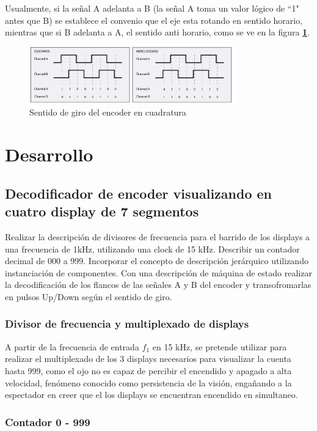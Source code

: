 \documentclass[11pt, a4paper]{article}
\begin{document}
Usualmente, si la señal A adelanta a B (la señal A toma un valor lógico de ``1" antes que B) se establece el convenio que el eje esta rotando en sentido horario, mientras que si B adelanta a A, el sentido anti horario, como se ve en la figura \textcolor{blue}{\textbf{\ref{fig:encoder_cuadratura}}}.
\begin{figure}[h]
	\centering
	\includegraphics[width=0.8\textwidth]{Imagenes/encoder_cuadratura.jpg}
	\caption{Sentido de giro del encoder en cuadratura}
	\label{fig:encoder_cuadratura}
\end{figure} 

\section{Desarrollo}

	\subsection{Decodificador de encoder visualizando en cuatro display de 7 segmentos}
	Realizar la descripción de divisores de frecuencia para el barrido de los displays a una frecuencia de 1kHz, utilizando una clock de 15 kHz. Describir un contador decimal de 000 a 999. Incorporar el concepto de descripción jerárquico utilizando instanciación de componentes.
	Con una descripción de máquina de estado realizar la decodificación de los flancos de las señales A y B del encoder y transofromarlas en pulsos Up/Down según el sentido de giro.

		\subsubsection{Divisor de frecuencia y multiplexado de displays}
			A partir de la frecuencia de entrada $f_1$ en 15 kHz, se pretende utilizar para realizar el multiplexado de los 3 displays necesarios para visualizar la cuenta hasta 999, como el ojo no es capaz de percibir el encendido y apagado a alta velocidad, fenómeno conocido como persistencia de la visión, engañando a la espectador en creer que el los displays se encuentran encendido en simultaneo. 

		\subsubsection{Contador 0 - 999}
		
\end{document}
